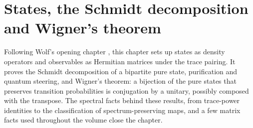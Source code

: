 \chapter{States, the Schmidt decomposition and Wigner's theorem}\label{ch:deconstructing_quantum}

Following Wolf's opening chapter \cite[Chapter~1]{Wolf2012Quantum}, this
chapter sets up states as density operators and observables as Hermitian
matrices under the trace pairing. It proves the Schmidt decomposition of a
bipartite pure state, purification and quantum steering, and Wigner's theorem:
a bijection of the pure states that preserves transition probabilities is
conjugation by a unitary, possibly composed with the transpose. The spectral
facts behind these results, from trace-power identities to the classification
of spectrum-preserving maps, and a few matrix facts used throughout the volume
close the chapter.








